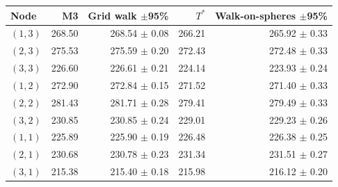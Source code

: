 \begin{tabular}{@{}l r r r r@{}}
\toprule
Node & M3 & Grid walk $\pm$95\% & $T^*$ & Walk-on-spheres $\pm$95\% \\
\midrule
$(1,3)$ & 268.50 & 268.54 $\pm$ 0.08 & 266.21 & 265.92 $\pm$ 0.33 \\
$(2,3)$ & 275.53 & 275.59 $\pm$ 0.20 & 272.43 & 272.48 $\pm$ 0.33 \\
$(3,3)$ & 226.60 & 226.61 $\pm$ 0.21 & 224.14 & 223.93 $\pm$ 0.24 \\
$(1,2)$ & 272.90 & 272.84 $\pm$ 0.15 & 271.52 & 271.40 $\pm$ 0.33 \\
$(2,2)$ & 281.43 & 281.71 $\pm$ 0.28 & 279.41 & 279.49 $\pm$ 0.33 \\
$(3,2)$ & 230.85 & 230.85 $\pm$ 0.24 & 229.01 & 229.23 $\pm$ 0.26 \\
$(1,1)$ & 225.89 & 225.90 $\pm$ 0.19 & 226.48 & 226.38 $\pm$ 0.25 \\
$(2,1)$ & 230.68 & 230.78 $\pm$ 0.23 & 231.34 & 231.51 $\pm$ 0.27 \\
$(3,1)$ & 215.38 & 215.40 $\pm$ 0.18 & 215.98 & 216.12 $\pm$ 0.20 \\
\bottomrule
\end{tabular}
